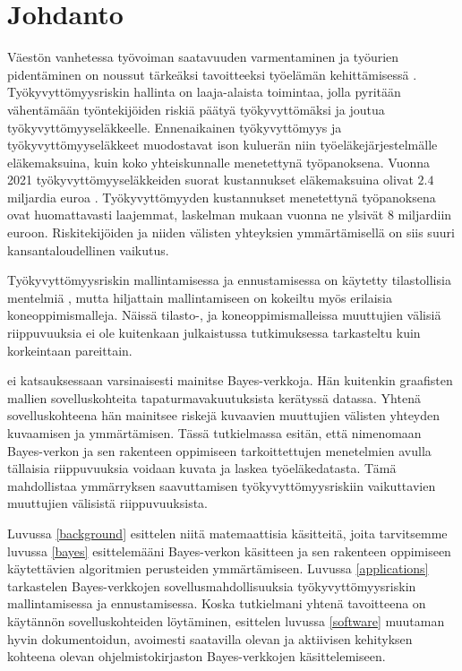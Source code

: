 \chapter{Johdanto\label{intro}}

Väestön vanhetessa työvoiman saatavuuden varmentaminen ja työurien pidentäminen on noussut tärkeäksi tavoitteeksi työelämän kehittämisessä \citep{noauthor_paaministeri_2019}. Työkyvyttömyysriskin hallinta on laaja-alaista toimintaa, jolla pyritään vähentämään työntekijöiden riskiä päätyä työkyvyttömäksi ja joutua työkyvyttömyyseläkkeelle.
Ennenaikainen työkyvyttömyys ja työkyvyttömyyseläkkeet muodostavat ison kuluerän niin työeläkejärjestelmälle eläkemaksuina, kuin koko yhteiskunnalle menetettynä työpanoksena. Vuonna 2021 työkyvyttömyyseläkkeiden suorat kustannukset eläkemaksuina olivat $2.4$ miljardia euroa \citep{etk_show_me_the_money}. Työkyvyttömyyden kustannukset menetettynä työpanoksena ovat huomattavasti laajemmat, \citet{rissanen_menetetyn_2014} laskelman mukaan vuonna ne ylsivät $8$ miljardiin euroon. Riskitekijöiden ja niiden välisten yhteyksien ymmärtämisellä on siis suuri kansantaloudellinen vaikutus.

Työkyvyttömyysriskin mallintamisessa ja ennustamisessa on käytetty tilastollisia mentelmiä \citep{gross_machine_2020}, mutta hiljattain mallintamiseen on kokeiltu myös erilaisia koneoppimismalleja. Näissä tilasto-, ja koneoppimismalleissa muuttujien välisiä riippuvuuksia ei ole kuitenkaan julkaistussa tutkimuksessa tarkasteltu kuin korkeintaan pareittain.

\citet{ramsahai_connecting_2020} ei katsauksessaan varsinaisesti mainitse Bayes-verkkoja. Hän kuitenkin graafisten mallien sovelluskohteita tapaturmavakuutuksista kerätyssä datassa. Yhtenä sovelluskohteena hän mainitsee riskejä kuvaavien muuttujien välisten yhteyden kuvaamisen ja ymmärtämisen. Tässä tutkielmassa esitän, että nimenomaan Bayes-verkon ja sen rakenteen oppimiseen tarkoittettujen menetelmien avulla tällaisia riippuvuuksia voidaan kuvata ja laskea työeläkedatasta. Tämä mahdollistaa ymmärryksen saavuttamisen työkyvyttömyysriskiin vaikuttavien muuttujien välisistä riippuvuuksista.

Luvussa \ref{background} esittelen niitä matemaattisia käsitteitä, joita tarvitsemme luvussa \ref{bayes} esittelemääni Bayes-verkon käsitteen ja sen rakenteen oppimiseen käytettävien algoritmien perusteiden ymmärtämiseen. Luvussa \ref{applications} tarkastelen Bayes-verkkojen sovellusmahdollisuuksia työkyvyttömyysriskin mallintamisessa ja ennustamisessa. Koska tutkielmani yhtenä tavoitteena on käytännön sovelluskohteiden löytäminen, esittelen luvussa \ref{software} muutaman hyvin dokumentoidun, avoimesti saatavilla olevan ja aktiivisen kehityksen kohteena olevan ohjelmistokirjaston Bayes-verkkojen käsittelemiseen. 



 


